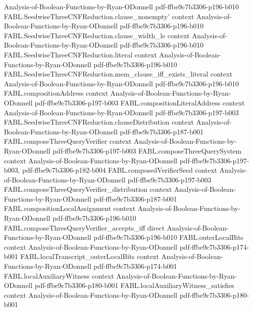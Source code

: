 \begin{theorem}
  {Analysis-of-Boolean-Functions-by-Ryan-ODonnell}
  {pdf-ffbe9c7b3306-p196-b010}
\proofstep
  {FABL.SeedwiseThreeCNFReduction.clause_nonempty'}
  {context}
  {Analysis-of-Boolean-Functions-by-Ryan-ODonnell}
  {pdf-ffbe9c7b3306-p196-b010}
\proofstep
  {FABL.SeedwiseThreeCNFReduction.clause_width_le}
  {context}
  {Analysis-of-Boolean-Functions-by-Ryan-ODonnell}
  {pdf-ffbe9c7b3306-p196-b010}
\proofstep
  {FABL.SeedwiseThreeCNFReduction.literal}
  {context}
  {Analysis-of-Boolean-Functions-by-Ryan-ODonnell}
  {pdf-ffbe9c7b3306-p196-b010}
\proofstep
  {FABL.SeedwiseThreeCNFReduction.mem_clause_iff_exists_literal}
  {context}
  {Analysis-of-Boolean-Functions-by-Ryan-ODonnell}
  {pdf-ffbe9c7b3306-p196-b010}
\proofstep
  {FABL.compositionAddress}
  {context}
  {Analysis-of-Boolean-Functions-by-Ryan-ODonnell}
  {pdf-ffbe9c7b3306-p197-b003}
\proofstep
  {FABL.compositionLiteralAddress}
  {context}
  {Analysis-of-Boolean-Functions-by-Ryan-ODonnell}
  {pdf-ffbe9c7b3306-p197-b003}
\proofstep
  {FABL.SeedwiseThreeCNFReduction.clauseDistribution}
  {context}
  {Analysis-of-Boolean-Functions-by-Ryan-ODonnell}
  {pdf-ffbe9c7b3306-p187-b001}
\proofstep
  {FABL.composeThreeQueryVerifier}
  {context}
  {Analysis-of-Boolean-Functions-by-Ryan-ODonnell}
  {pdf-ffbe9c7b3306-p197-b003}
\proofstep
  {FABL.composeThreeQuerySystem}
  {context}
  {Analysis-of-Boolean-Functions-by-Ryan-ODonnell}
  {pdf-ffbe9c7b3306-p197-b003,
    pdf-ffbe9c7b3306-p182-b004}
\proofstep
  {FABL.composedVerifierSeed}
  {context}
  {Analysis-of-Boolean-Functions-by-Ryan-ODonnell}
  {pdf-ffbe9c7b3306-p197-b003}
\proofstep
  {FABL.composeThreeQueryVerifier_distribution}
  {context}
  {Analysis-of-Boolean-Functions-by-Ryan-ODonnell}
  {pdf-ffbe9c7b3306-p187-b001}
\proofstep
  {FABL.compositionLocalAssignment}
  {context}
  {Analysis-of-Boolean-Functions-by-Ryan-ODonnell}
  {pdf-ffbe9c7b3306-p196-b010}
\proofstep
  {FABL.composeThreeQueryVerifier_accepts_iff}
  {direct}
  {Analysis-of-Boolean-Functions-by-Ryan-ODonnell}
  {pdf-ffbe9c7b3306-p196-b010}
\proofstep
  {FABL.outerLocalBits}
  {context}
  {Analysis-of-Boolean-Functions-by-Ryan-ODonnell}
  {pdf-ffbe9c7b3306-p174-b001}
\proofstep
  {FABL.localTranscript_outerLocalBits}
  {context}
  {Analysis-of-Boolean-Functions-by-Ryan-ODonnell}
  {pdf-ffbe9c7b3306-p174-b001}
\proofstep
  {FABL.localAuxiliaryWitness}
  {context}
  {Analysis-of-Boolean-Functions-by-Ryan-ODonnell}
  {pdf-ffbe9c7b3306-p180-b001}
\proofstep
  {FABL.localAuxiliaryWitness_satisfies}
  {context}
  {Analysis-of-Boolean-Functions-by-Ryan-ODonnell}
  {pdf-ffbe9c7b3306-p180-b001}
\proofstep

\end{theorem}
